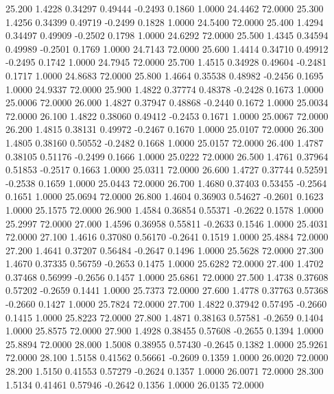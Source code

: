   25.200   1.4228   0.34297   0.49444  -0.2493   0.1860   1.0000  24.4462  72.0000
  25.300   1.4256   0.34399   0.49719  -0.2499   0.1828   1.0000  24.5400  72.0000
  25.400   1.4294   0.34497   0.49909  -0.2502   0.1798   1.0000  24.6292  72.0000
  25.500   1.4345   0.34594   0.49989  -0.2501   0.1769   1.0000  24.7143  72.0000
  25.600   1.4414   0.34710   0.49912  -0.2495   0.1742   1.0000  24.7945  72.0000
  25.700   1.4515   0.34928   0.49604  -0.2481   0.1717   1.0000  24.8683  72.0000
  25.800   1.4664   0.35538   0.48982  -0.2456   0.1695   1.0000  24.9337  72.0000
  25.900   1.4822   0.37774   0.48378  -0.2428   0.1673   1.0000  25.0006  72.0000
  26.000   1.4827   0.37947   0.48868  -0.2440   0.1672   1.0000  25.0034  72.0000
  26.100   1.4822   0.38060   0.49412  -0.2453   0.1671   1.0000  25.0067  72.0000
  26.200   1.4815   0.38131   0.49972  -0.2467   0.1670   1.0000  25.0107  72.0000
  26.300   1.4805   0.38160   0.50552  -0.2482   0.1668   1.0000  25.0157  72.0000
  26.400   1.4787   0.38105   0.51176  -0.2499   0.1666   1.0000  25.0222  72.0000
  26.500   1.4761   0.37964   0.51853  -0.2517   0.1663   1.0000  25.0311  72.0000
  26.600   1.4727   0.37744   0.52591  -0.2538   0.1659   1.0000  25.0443  72.0000
  26.700   1.4680   0.37403   0.53455  -0.2564   0.1651   1.0000  25.0694  72.0000
  26.800   1.4604   0.36903   0.54627  -0.2601   0.1623   1.0000  25.1575  72.0000
  26.900   1.4584   0.36854   0.55371  -0.2622   0.1578   1.0000  25.2997  72.0000
  27.000   1.4596   0.36958   0.55811  -0.2633   0.1546   1.0000  25.4031  72.0000
  27.100   1.4616   0.37080   0.56170  -0.2641   0.1519   1.0000  25.4884  72.0000
  27.200   1.4641   0.37207   0.56484  -0.2647   0.1496   1.0000  25.5628  72.0000
  27.300   1.4670   0.37335   0.56759  -0.2653   0.1475   1.0000  25.6282  72.0000
  27.400   1.4702   0.37468   0.56999  -0.2656   0.1457   1.0000  25.6861  72.0000
  27.500   1.4738   0.37608   0.57202  -0.2659   0.1441   1.0000  25.7373  72.0000
  27.600   1.4778   0.37763   0.57368  -0.2660   0.1427   1.0000  25.7824  72.0000
  27.700   1.4822   0.37942   0.57495  -0.2660   0.1415   1.0000  25.8223  72.0000
  27.800   1.4871   0.38163   0.57581  -0.2659   0.1404   1.0000  25.8575  72.0000
  27.900   1.4928   0.38455   0.57608  -0.2655   0.1394   1.0000  25.8894  72.0000
  28.000   1.5008   0.38955   0.57430  -0.2645   0.1382   1.0000  25.9261  72.0000
  28.100   1.5158   0.41562   0.56661  -0.2609   0.1359   1.0000  26.0020  72.0000
  28.200   1.5150   0.41553   0.57279  -0.2624   0.1357   1.0000  26.0071  72.0000
  28.300   1.5134   0.41461   0.57946  -0.2642   0.1356   1.0000  26.0135  72.0000
